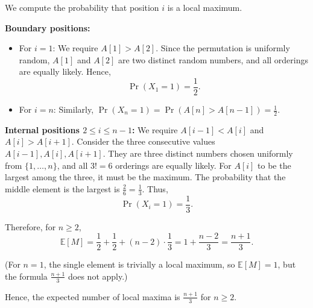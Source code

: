 We compute the probability that position \(i\) is a local maximum.

\noindent\textbf{Boundary positions:}
\begin{itemize}
    \item For \(i = 1\): We require \(A[1] > A[2]\). Since the permutation is uniformly random, \(A[1]\) and \(A[2]\) are two distinct random numbers, and all orderings are equally likely. Hence,
    \[
    \Pr(X_1 = 1) = \frac{1}{2}.
    \]
    \item For \(i = n\): Similarly, \(\Pr(X_n = 1) = \Pr(A[n] > A[n-1]) = \frac{1}{2}\).
\end{itemize}

\noindent\textbf{Internal positions \(2 \leq i \leq n-1\):}
We require \(A[i-1] < A[i]\) and \(A[i] > A[i+1]\). Consider the three consecutive values \(A[i-1], A[i], A[i+1]\). They are three distinct numbers chosen uniformly from \(\{1,\dots,n\}\), and all \(3! = 6\) orderings are equally likely. For \(A[i]\) to be the largest among the three, it must be the maximum. The probability that the middle element is the largest is \(\frac{2}{6} = \frac{1}{3}\). Thus,
\[
\Pr(X_i = 1) = \frac{1}{3}.
\]

Therefore, for \(n \ge 2\),
\[
\mathbb{E}[M] = \frac{1}{2} + \frac{1}{2} + (n-2)\cdot\frac{1}{3} = 1 + \frac{n-2}{3} = \frac{n+1}{3}.
\]

(For \(n = 1\), the single element is trivially a local maximum, so \(\mathbb{E}[M] = 1\), but the formula \(\frac{n+1}{3}\) does not apply.)

Hence, the expected number of local maxima is \({\frac{n+1}{3}}\) for \(n \ge 2\).


\newpage